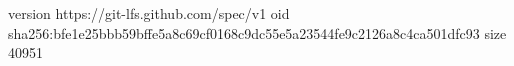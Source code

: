 version https://git-lfs.github.com/spec/v1
oid sha256:bfe1e25bbb59bffe5a8c69cf0168c9dc55e5a23544fe9c2126a8c4ca501dfc93
size 40951
